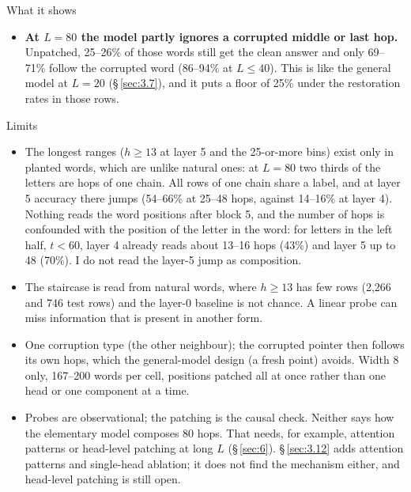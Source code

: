 \documentclass[paper=a4,fontsize=11pt,DIV=11,parskip=half,headings=small,numbers=noendperiod]{scrartcl}
\DeclareRobustCommand{\lead}[1]{\textsf{\bfseries\color{accent}#1}}
\begin{document}
\begin{findbox}{What it shows}
\begin{itemize}
  2, 3 and 4 ($L=40$). In \S\,\ref{sec:3.10} this set restored nothing in any condition. The right side restores
  it, as in \S\,\ref{sec:3.10}, when it holds hop letters (middle or last hop; last hop, $L=40$: 0.87 after
  block 2, 1.00 after blocks 3 and 4); the left side does so only in this model (first or middle hop), and not
  when it holds no hop letters (last hop). The corrupted letter’s own state carries the answer through layer 1
  (0.92–0.93) and not after layer 2 (0.38–0.44), and the “neither chain” control stays near the unpatched level
  (0.13 to 0.21 at most).
\item \lead{At $L=80$ the model partly ignores a corrupted middle or last hop.} Unpatched, 25–26\% of those
  words still get the clean answer and only 69–71\% follow the corrupted word (86–94\% at $L\le40$). This is
  like the general model at $L=20$ (\S\,\ref{sec:3.7}), and it puts a floor of 25\% under the restoration rates
  in those rows.
\end{itemize}
\end{findbox}

\begin{limbox}{Limits}
\begin{itemize}
\item The longest ranges ($h\ge13$ at layer 5 and the 25-or-more bins) exist only in planted words, which are
  unlike natural ones: at $L=80$ two thirds of the letters are hops of one chain. All rows of one chain share a
  label, and at layer 5 accuracy there jumps (54–66\% at 25–48 hops, against 14–16\% at layer 4). Nothing reads
  the word positions after block 5, and the number of hops is confounded with the position of the letter in the
  word: for letters in the left half, $t<60$, layer 4 already reads about 13–16 hops (43\%) and layer 5 up to 48
  (70\%). I do not read the layer-5 jump as composition.
\item The staircase is read from natural words, where $h\ge13$ has few rows (2,266 and 746 test rows) and the
  layer-0 baseline is not chance. A linear probe can miss information that is present in another form.
\item One corruption type (the other neighbour); the corrupted pointer then follows its own hops, which the
  general-model design (a fresh point) avoids. Width 8 only, 167–200 words per cell, positions patched all at
  once rather than one head or one component at a time.
\item Probes are observational; the patching is the causal check. Neither says how the elementary model composes
  80 hops. That needs, for example, attention patterns or head-level patching at long $L$ (\S\,\ref{sec:6}).
  \S\,\ref{sec:3.12} adds attention patterns and single-head ablation; it does not find the mechanism either,
  and head-level patching is still open.
\end{itemize}
\end{limbox}
\end{document}

